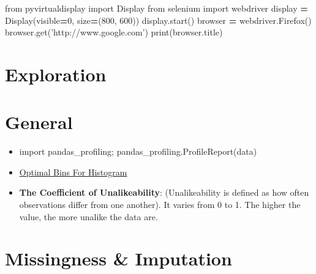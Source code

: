 \documentclass[]{book}
\newenvironment{Shaded}{\begin{snugshade}}{\end{snugshade}}
\newcommand{\DecValTok}[1]{\textcolor[rgb]{0.00,0.00,0.81}{#1}}
\newcommand{\StringTok}[1]{\textcolor[rgb]{0.31,0.60,0.02}{#1}}
\newcommand{\ImportTok}[1]{#1}
\newcommand{\OperatorTok}[1]{\textcolor[rgb]{0.81,0.36,0.00}{\textbf{#1}}}
\newcommand{\BuiltInTok}[1]{#1}
\newcommand{\NormalTok}[1]{#1}
\theoremstyle{definition}
\theoremstyle{definition}
\theoremstyle{definition}
\theoremstyle{remark}
\begin{document}
\begin{Shaded}
\begin{Highlighting}[]
\ImportTok{from}\NormalTok{ pyvirtualdisplay }\ImportTok{import}\NormalTok{ Display  }
\ImportTok{from}\NormalTok{ selenium }\ImportTok{import}\NormalTok{ webdriver  }
\NormalTok{display }\OperatorTok{=}\NormalTok{ Display(visible}\OperatorTok{=}\DecValTok{0}\NormalTok{, size}\OperatorTok{=}\NormalTok{(}\DecValTok{800}\NormalTok{, }\DecValTok{600}\NormalTok{))  }
\NormalTok{display.start()  }
\NormalTok{browser }\OperatorTok{=}\NormalTok{ webdriver.Firefox()  }
\NormalTok{browser.get(}\StringTok{'http://www.google.com'}\NormalTok{)  }
\BuiltInTok{print}\NormalTok{(browser.title)}
\end{Highlighting}
\end{Shaded}

\section{Exploration}\label{exploration}

\section{General}\label{general-1}

\begin{itemize}
\item
  import pandas\_profiling; pandas\_profiling.ProfileReport(data)
\item
  \href{https://stats.stackexchange.com/questions/798/calculating-optimal-number-of-bins-in-a-histogram/862\#862}{Optimal
  Bins For Histogram}
\item
  \textbf{The Coefficient of Unalikeability}: (Unalikeability is defined
  as how often observations differ from one another). It varies from 0
  to 1. The higher the value, the more unalike the data are.
\end{itemize}

\section{Missingness \& Imputation}\label{missingness-imputation}
\end{document}
